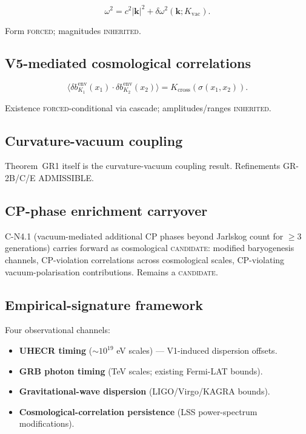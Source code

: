 \documentclass[11pt,a4paper]{article}
\begin{document}
\begin{equation}
\omega^2 = c^2 |\mathbf{k}|^2 + \delta\omega^2(\mathbf{k}; K_\mathrm{vac}).
\end{equation}

Form \textsc{forced}; magnitudes \textsc{inherited}.

\subsection{V5-mediated cosmological correlations}

\begin{equation}
\langle \delta b_{K_1}^\mathrm{env}(x_1) \cdot \delta b_{K_2}^\mathrm{env}(x_2) \rangle = K_\mathrm{cross}(\sigma(x_1, x_2)).
\end{equation}

Existence \textsc{forced}-conditional via cascade; amplitudes/ranges \textsc{inherited}.

\subsection{Curvature-vacuum coupling}

Theorem~GR1 itself is the curvature-vacuum coupling result. Refinements GR-2B/C/E ADMISSIBLE.

\subsection{CP-phase enrichment carryover}

C-N4.1 (vacuum-mediated additional CP phases beyond Jarlskog count for $\geq 3$ generations) carries forward as cosmological \textsc{candidate}: modified baryogenesis channels, CP-violation correlations across cosmological scales, CP-violating vacuum-polarisation contributions. Remains a \textsc{candidate}.

\subsection{Empirical-signature framework}

Four observational channels:
\begin{itemize}
  \item \textbf{UHECR timing} ($\sim 10^{19}$ eV scales) --- V1-induced dispersion offsets.
  \item \textbf{GRB photon timing} (TeV scales; existing Fermi-LAT bounds).
  \item \textbf{Gravitational-wave dispersion} (LIGO/Virgo/KAGRA bounds).
  \item \textbf{Cosmological-correlation persistence} (LSS power-spectrum modifications).
\end{itemize}
\end{document}

